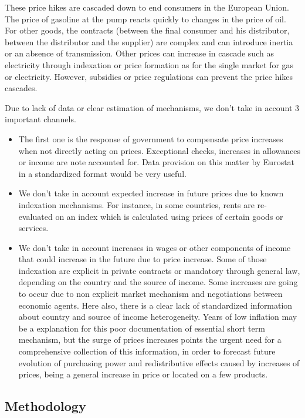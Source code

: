 \documentclass[
  9pt,
  a4paper,
  numbers=noendperiod,
  DIV=12]{scrartcl}
\begin{document}
These price hikes are cascaded down to end consumers in the European
Union. The price of gasoline at the pump reacts quickly to changes in
the price of oil. For other goods, the contracts (between the final
consumer and his distributor, between the distributor and the supplier)
are complex and can introduce inertia or an absence of transmission.
Other prices can increase in cascade such as electricity through
indexation or price formation as for the single market for gas or
electricity. However, subsidies or price regulations can prevent the
price hikes cascades.

Due to lack of data or clear estimation of mechanisms, we don't take in
account 3 important channels.

\begin{itemize}
\item
  The first one is the response of government to compensate price
  increases when not directly acting on prices. Exceptional checks,
  increases in allowances or income are note accounted for. Data
  provision on this matter by Eurostat in a standardized format would be
  very useful.
\item
  We don't take in account expected increase in future prices due to
  known indexation mechanisms. For instance, in some countries, rents
  are re-evaluated on an index which is calculated using prices of
  certain goods or services.
\item
  We don't take in account increases in wages or other components of
  income that could increase in the future due to price increase. Some
  of those indexation are explicit in private contracts or mandatory
  through general law, depending on the country and the source of
  income. Some increases are going to occur due to non explicit market
  mechanism and negotiations between economic agents. Here also, there
  is a clear lack of standardized information about country and source
  of income heterogeneity. Years of low inflation may be a explanation
  for this poor documentation of essential short term mechanism, but the
  surge of prices increases points the urgent need for a comprehensive
  collection of this information, in order to forecast future evolution
  of purchasing power and redistributive effects caused by increases of
  prices, being a general increase in price or located on a few
  products.
\end{itemize}

\hypertarget{methodology}{%
\subsection{Methodology}\label{methodology}}
\end{document}
